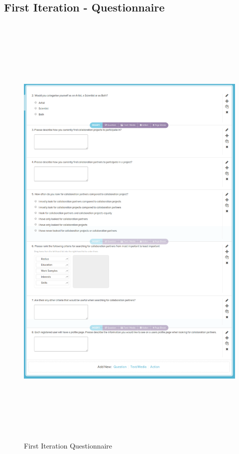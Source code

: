 \documentclass[a4paper,oneside,11pt]{report}
\begin{document}
\begin{appendices}
\pagebreak
\section{First Iteration - Questionnaire}
\begin{figure}[!ht]
\centering
\includegraphics[width=16cm,height=22cm]{appendix/first-iteration-questionnaire.png}
\caption{First Iteration Questionnaire}
\end{figure}

\pagebreak

\end{appendices}
\end{document}
